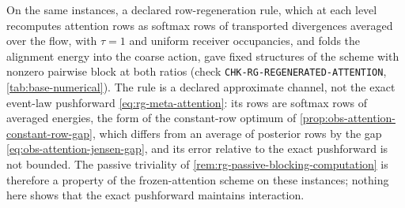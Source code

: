 On the same instances, a declared row-regeneration rule, which at each level
recomputes attention rows as softmax rows of transported divergences averaged
over the flow, with \(\tau=1\) and uniform receiver occupancies, and folds the
alignment energy into the coarse action, gave fixed structures of the scheme
with nonzero pairwise block at both ratios (check
\texttt{CHK-RG-REGENERATED-ATTENTION}, \cref{tab:base-numerical}). The rule is
a declared approximate channel, not the exact event-law pushforward
\eqref{eq:rg-meta-attention}: its rows are softmax rows of averaged energies,
the form of the constant-row optimum of \cref{prop:obs-attention-constant-row-gap},
which differs from an average of posterior rows by the gap
\eqref{eq:obs-attention-jensen-gap}, and its error relative to the exact
pushforward is not bounded. The passive triviality of
\cref{rem:rg-passive-blocking-computation} is therefore a property of the
frozen-attention scheme on these instances; nothing here shows that the exact
pushforward maintains interaction. 

